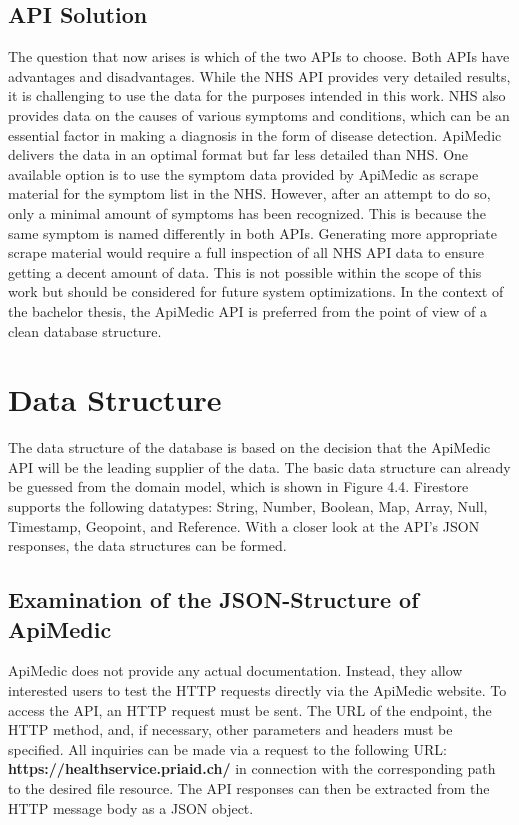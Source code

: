 \subsection{API Solution}
The question that now arises is which of the two APIs to choose. Both APIs have advantages and disadvantages. While the NHS API provides very detailed results, it is challenging to use the data for the purposes intended in this work. NHS also provides data on the causes of various symptoms and conditions, which can be an essential factor in making a diagnosis in the form of disease detection. ApiMedic delivers the data in an optimal format but far less detailed than NHS. One available option is to use the symptom data provided by ApiMedic as scrape material for the symptom list in the NHS. However, after an attempt to do so, only a minimal amount of symptoms has been recognized. This is because the same symptom is named differently in both APIs. Generating more appropriate scrape material would require a full inspection of all NHS API data to ensure getting a decent amount of data. This is not possible within the scope of this work but should be considered for future system optimizations. In the context of the bachelor thesis, the ApiMedic API is preferred from the point of view of a clean database structure.

\section{Data Structure}
The data structure of the database is based on the decision that the ApiMedic API will be the leading supplier of the data. The basic data structure can already be guessed from the domain model, which is shown in Figure 4.4. Firestore supports the following datatypes: String, Number, Boolean, Map, Array, Null, Timestamp, Geopoint, and Reference. With a closer look at the API's JSON responses, the data structures can be formed.

\subsection{Examination of the JSON-Structure of ApiMedic}
ApiMedic does not provide any actual documentation. Instead, they allow interested users to test the HTTP requests directly via the ApiMedic website. To access the API, an HTTP request must be sent. The URL of the endpoint, the HTTP method, and, if necessary, other parameters and headers must be specified. All inquiries can be made via a request to the following URL: \textbf{https://healthservice.priaid.ch/} in connection with the corresponding path to the desired file resource. The API responses can then be extracted from the HTTP message body as a JSON object.

